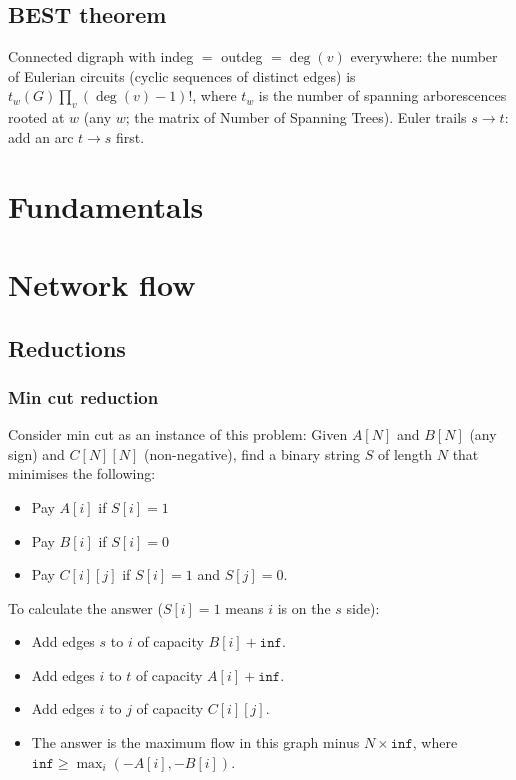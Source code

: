	\subsection{BEST theorem}
	Connected digraph with indeg $=$ outdeg $=\deg(v)$ everywhere: the number of Eulerian circuits (cyclic sequences of distinct edges) is $t_w(G)\prod_v(\deg(v)-1)!$, where $t_w$ is the number of spanning arborescences rooted at $w$ (any $w$; the matrix of Number of Spanning Trees). Euler trails $s\to t$: add an arc $t\to s$ first.

\section{Fundamentals}

\section{Network flow}
	\subsection{Reductions}
	
	\subsubsection{Min cut reduction}
		Consider min cut as an instance of this problem: 
		Given $A[N]$ and $B[N]$ (any sign) and $C[N][N]$ (non-negative), find a binary string $S$ of length $N$ that minimises the following: \\
		\begin{itemize}[noitemsep]
		\item Pay $A[i]$ if $S[i] = 1$ 
		\item Pay $B[i]$ if $S[i] = 0$ 
		\item Pay $C[i][j]$ if $S[i] = 1$ and $S[j] = 0$. 
		\end{itemize}
		To calculate the answer ($S[i] = 1$ means $i$ is on the $s$ side): 
		\begin{itemize}[noitemsep]
		\item Add edges $s$ to $i$ of capacity $B[i] + \texttt{inf}$. 
		\item Add edges $i$ to $t$ of capacity $A[i] + \texttt{inf}$. 
		\item Add edges $i$ to $j$ of capacity $C[i][j]$. 
\item The answer is the maximum flow in this graph minus $N \times \texttt{inf}$, where $\texttt{inf} \ge \max_i(-A[i], -B[i])$.
		\end{itemize}

